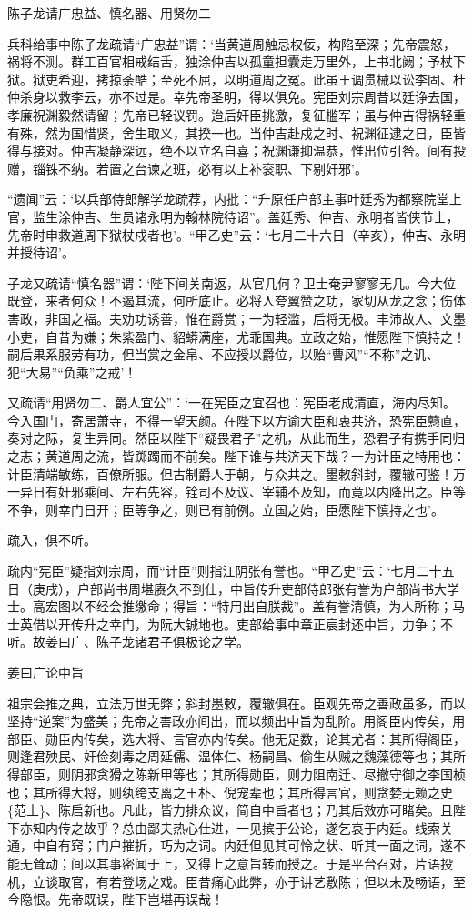 \documentclass[]{article}
\begin{document}
陈子龙请广忠益、慎名器、用贤勿二

兵科给事中陈子龙疏请``广忠益''谓：`当黄道周触忌权佞，构陷至深；先帝震怒，祸将不测。群工百官相戒结舌，独涂仲吉以孤童担囊走万里外，上书北阙；予杖下狱。狱吏希迎，拷掠荼酷；至死不屈，以明道周之冤。此虽王调贯械以讼李固、杜仲杀身以救李云，亦不过是。幸先帝圣明，得以俱免。宪臣刘宗周昔以廷诤去国，孝廉祝渊毅然请留；先帝已轻议罚。迨后奸臣挑激，复征槛军；虽与仲吉得祸轻重有殊，然为国惜贤，舍生取义，其揆一也。当仲吉赴戍之时、祝渊征逮之日，臣皆得与接对。仲吉凝静深远，绝不以立名自喜；祝渊谦抑温恭，惟出位引咎。间有投赠，锱铢不纳。若置之台谏之班，必有以上补衮职、下剔奸邪'。

``遗闻''云：`以兵部侍郎解学龙疏荐，内批：``升原任户部主事叶廷秀为都察院堂上官，监生涂仲吉、生员诸永明为翰林院待诏''。盖廷秀、仲吉、永明者皆侠节士，先帝时申救道周下狱杖戍者也'。``甲乙史''云：`七月二十六日（辛亥），仲吉、永明并授待诏'。

子龙又疏请``慎名器''谓：`陛下间关南返，从官几何？卫士奄尹寥寥无几。今大位既登，来者何众！不遏其流，何所底止。必将人夸翼赞之功，家切从龙之念；伤体害政，非国之福。夫劝功诱善，惟在爵赏；一为轻滥，后将无极。丰沛故人、文墨小吏，自昔为嫌；朱紫盈门、貂蟒满座，尤乖国典。立政之始，惟愿陛下慎持之！嗣后果系服劳有功，但当赏之金帛、不应授以爵位，以贻``曹风''``不称''之讥、犯``大易''``负乘''之戒'！

又疏请``用贤勿二、爵人宜公''：`一在宪臣之宜召也：宪臣老成清直，海内尽知。今入国门，寄居萧寺，不得一望天颜。在陛下以方谕大臣和衷共济，恐宪臣戆直，奏对之际，复生异同。然臣以陛下``疑畏君子''之机，从此而生，恐君子有携手同归之志；黄道周之流，皆踯躅而不前矣。陛下谁与共济天下哉？一为计臣之特用也：计臣清端敏练，百僚所服。但古制爵人于朝，与众共之。墨敕斜封，覆辙可鉴！万一异日有奸邪乘间、左右先容，铨司不及议、宰辅不及知，而竟以内降出之。臣等不争，则幸门日开；臣等争之，则已有前例。立国之始，臣愿陛下慎持之也'。

疏入，俱不听。

疏内``宪臣''疑指刘宗周，而``计臣''则指江阴张有誉也。``甲乙史''云：`七月二十五日（庚戌），户部尚书周堪赓久不到仕，中旨传升吏部侍郎张有誉为户部尚书大学士。高宏图以不经会推缴命；得旨：``特用出自朕裁''。盖有誉清慎，为人所称；马士英借以开传升之幸门，为阮大铖地也。吏部给事中章正宸封还中旨，力争；不听。故姜曰广、陈子龙诸君子俱极论之学。

姜曰广论中旨

祖宗会推之典，立法万世无弊；斜封墨敕，覆辙俱在。臣观先帝之善政虽多，而以坚持``逆案''为盛美；先帝之害政亦间出，而以频出中旨为乱阶。用阁臣内传矣，用部臣、勋臣内传矣，选大将、言官亦内传矣。他无足数，论其尤者：其所得阁臣，则逢君殃民、奸俭刻毒之周延儒、温体仁、杨嗣昌、偷生从贼之魏藻德等也；其所得部臣，则阴邪贪猾之陈新甲等也；其所得勋臣，则力阻南迁、尽撤守御之李国桢也；其所得大将，则纨绔支离之王朴、倪宠辈也；其所得言官，则贪婪无赖之史\{范土\}、陈启新也。凡此，皆力排众议，简自中旨者也；乃其后效亦可睹矣。且陛下亦知内传之故乎？总由鄙夫热心仕进，一见摈于公论，遂乞哀于内廷。线索关通，中自有窍；门户摧折，巧为之词。内廷但见其可怜之状、听其一面之词，遂不能无耸动；间以其事密闻于上，又得上之意旨转而授之。于是平台召对，片语投机，立谈取官，有若登场之戏。臣昔痛心此弊，亦于讲艺敷陈；但以未及畅语，至今隐恨。先帝既误，陛下岂堪再误哉！
\end{document}

